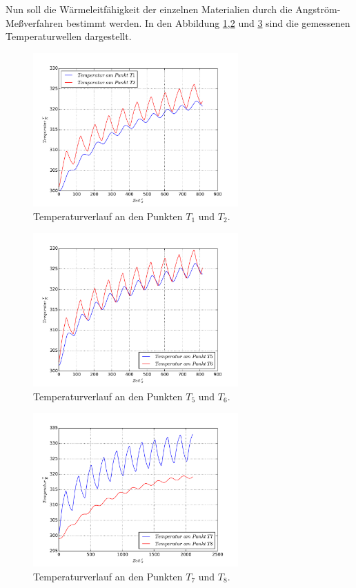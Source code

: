 Nun soll die Wärmeleitfähigkeit der einzelnen
Materialien durch
die Angström-Meßverfahren bestimmt werden.
In den Abbildung \ref{abb:T1T2},\ref{abb:T5T6} und \ref{abb:T7T8}
sind die gemessenen Temperaturwellen dargestellt.
\begin{figure}
  \centering
  \includegraphics[width=0.7\textwidth]{plotT1T2.pdf}
  \caption{Temperaturverlauf an den Punkten $T_1$ und $T_2$.}
  \label{abb:T1T2}
\end{figure}
\begin{figure}
  \centering
  \includegraphics[width=0.7\textwidth]{plotT5T6.pdf}
  \caption{Temperaturverlauf an den Punkten $T_5$ und $T_6$.}
  \label{abb:T5T6}
\end{figure}
\begin{figure}
  \centering
  \includegraphics[width=0.7\textwidth]{plotT7T8.pdf}
  \caption{Temperaturverlauf an den Punkten $T_7$ und $T_8$.}
  \label{abb:T7T8}
\end{figure}
